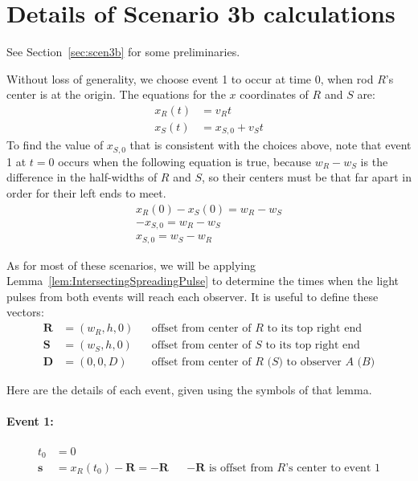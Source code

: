 \documentclass[a4paper]{article}
\theoremstyle{plain}
\theoremstyle{definition}
\newcommand{\vect}[1]{\mathbf{#1}}
\begin{document}
\section{Details of Scenario 3b calculations}
\label{app:scen3b}

See Section~\ref{sec:scen3b} for some preliminaries.

Without loss of generality, we choose event 1 to occur at time 0, when
rod $R$'s center is at the origin.  The equations for the $x$
coordinates of $R$ and $S$ are:
\begin{align*}
  x_R(t) & = v_R t \\
  x_S(t) & = x_{S,0} + v_S t
\end{align*}
To find the value of $x_{S,0}$ that is consistent with the choices
above, note that event 1 at $t=0$ occurs when the following equation
is true, because $w_R - w_S$ is the difference in the half-widths of
$R$ and $S$, so their centers must be that far apart in order for
their left ends to meet.
\begin{align*}
x_R(0) - x_S(0) = w_R - w_S \\
-x_{S,0} = w_R - w_S \\
x_{S,0} = w_S - w_R
\end{align*}

As for most of these scenarios, we will be applying
Lemma~\ref{lem:IntersectingSpreadingPulse} to determine the times when
the light pulses from both events will reach each observer.
It is useful to define these vectors:
\begin{align}
\vect{R} & = (w_R, h, 0) & & \text{offset from center of $R$ to its top right end} \\
\vect{S} & = (w_S, h, 0) & & \text{offset from center of $S$ to its top right end} \\
\vect{D} & = (0, 0, D) & & \text{offset from center of $R$ ($S$) to observer $A$ ($B$)}
\end{align}

Here are the details of each event, given using the symbols of that
lemma.


\paragraph{Event 1:}

\begin{align}
t_0 & = 0 \\
\vect{s} & = x_R(t_0) - \vect{R} = -\vect{R} & & \text{$-\vect{R}$ is offset from $R$'s center to event 1}
\end{align}
\end{document}
